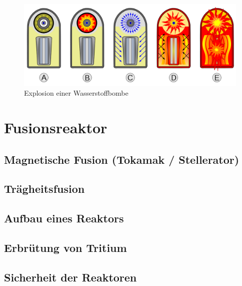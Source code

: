 \documentclass[10pt,a4paper, ngerman]{beamer}
\begin{document}
\begin{frame}{\subsecname}{\secname}
\begin{figure}
\centering
\includegraphics[width=\linewidth]{h-bomb-expl}
\caption{Explosion einer Wasserstoffbombe}
\label{fig:h-bomb-expl}
\end{figure}
\end{frame}


\section{Fusionsreaktor}
\subsection[Magnetische Fusion]{Magnetische Fusion (Tokamak / Stellerator)}
\begin{frame}{\subsecname}{\secname}

\end{frame}

\subsection{Trägheitsfusion}
\begin{frame}{\subsecname}{\secname}

\end{frame}

\subsection{Aufbau eines Reaktors}
\begin{frame}{\subsecname}{\secname}

\end{frame}

\subsection{Erbrütung von Tritium}
\begin{frame}{\subsecname}{\secname}

\end{frame}

\subsection{Sicherheit der Reaktoren}
\begin{frame}{\subsecname}{\secname}

\end{frame}



\begin{frame}
\titlepage
\end{frame}
\end{document}
